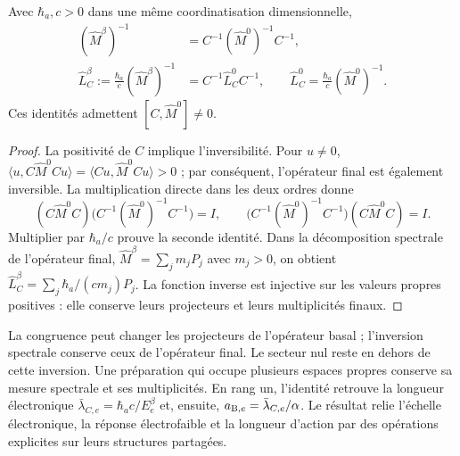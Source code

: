 \begin{proposition}
Avec $\hbar_a,c>0$ dans une même coordinatisation dimensionnelle,
\begin{equation}
 \begin{aligned}
 (\widehat M^\beta)^{-1}
    &=C^{-1}(\widehat M^0)^{-1}C^{-1},\\
 \widehat L_C^\beta:=\frac{\hbar_a}{c}(\widehat M^\beta)^{-1}
    &=C^{-1}\widehat L_C^0C^{-1},\qquad
 \widehat L_C^0=\frac{\hbar_a}{c}(\widehat M^0)^{-1}.
 \end{aligned}
 \label{amp-ew-inversa-operador}
\end{equation}
Ces identités admettent $[C,\widehat M^0]\ne0$.
\end{proposition}
\begin{proof}
La positivité de $C$ implique l’inversibilité. Pour $u\ne0$,
$\langle u,C\widehat M^0Cu\rangle
=\langle Cu,\widehat M^0Cu\rangle>0$ ; par conséquent, l’opérateur final
est également inversible. La multiplication directe dans les deux ordres donne
\[
 (C\widehat M^0C)\bigl(C^{-1}(\widehat M^0)^{-1}C^{-1}\bigr)=I,
 \qquad
 \bigl(C^{-1}(\widehat M^0)^{-1}C^{-1}\bigr)(C\widehat M^0C)=I.
\]
Multiplier par $\hbar_a/c$ prouve la seconde identité. Dans la
décomposition spectrale de l’opérateur final,
$\widehat M^\beta=\sum_jm_jP_j$ avec $m_j>0$, on obtient
$\widehat L_C^\beta=\sum_j\hbar_a/(cm_j)P_j$. La fonction inverse
est injective sur les valeurs propres positives : elle conserve leurs projecteurs
et leurs multiplicités finaux.
\end{proof}

La congruence peut changer les projecteurs de l’opérateur basal ;
l’inversion spectrale conserve ceux de l’opérateur final. Le secteur nul
reste en dehors de cette inversion. Une préparation qui occupe plusieurs
espaces propres conserve sa mesure spectrale et ses multiplicités.
En rang un, l’identité retrouve la longueur électronique
$\bar\lambda_{C,e}=\hbar_ac/E_e^\beta$ et, ensuite,
$a_{{\rm B},e}=\bar\lambda_{C,e}/\alpha$. Le résultat relie
l’échelle électronique, la réponse électrofaible et la longueur d’action
par des opérations explicites sur leurs structures partagées.
